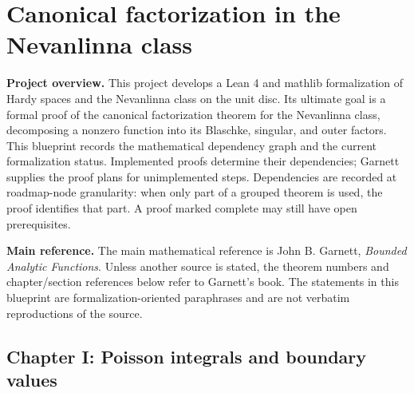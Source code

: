 %
%
%

\chapter{Canonical factorization in the Nevanlinna class}

\noindent\textbf{Project overview.}
This project develops a Lean 4 and mathlib formalization of Hardy spaces and
the Nevanlinna class on the unit disc. Its ultimate goal is a formal proof of
the canonical factorization theorem for the Nevanlinna class, decomposing a
nonzero function into its Blaschke, singular, and outer factors. This
blueprint records the mathematical dependency graph and the current
formalization status. Implemented proofs determine their dependencies; Garnett
supplies the proof plans for unimplemented steps. Dependencies are recorded at
roadmap-node granularity: when only part of a grouped theorem is used, the proof
identifies that part. A proof marked complete may still have open prerequisites.

\medskip
\noindent\textbf{Main reference.}
The main mathematical reference is John B. Garnett,
\emph{Bounded Analytic Functions}. Unless another source is stated,
the theorem numbers and chapter/section references below refer to Garnett's
book. The statements in this blueprint are formalization-oriented paraphrases
and are not verbatim reproductions of the source.

\section{Chapter I: Poisson integrals and boundary values}

